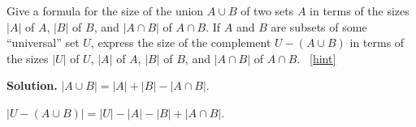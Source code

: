 \documentclass{book}
\begin{document}
\setcounter{project}{217}
\addtocounter{project}{-1}
\begin{activity}[]\label{twosetintersection}
\hypertarget{p-1220}{}%
Give a formula for the size of the union \(A\cup B\) of two sets \(A\) in terms of the sizes \(|A|\) of \(A\), \(|B|\) of \(B\), and \(|A\cap B|\) of \(A\cap B\). If \(A\) and \(B\) are subsets of some ``universal'' set \(U\), express the size of the complement \(U-(A\cup B)\) in terms of the sizes \(|U|\) of \(U\), \(|A|\) of \(A\), \(|B|\) of \(B\), and \(|A\cap B|\) of \(A\cap B\).%
~\hfill{\tiny\hyperlink{a-217}{[hint]}\hypertarget{q-217}{}}\par\smallskip%
\noindent\textbf{Solution.}\hypertarget{solution-140}{}\quad%
\hypertarget{p-1222}{}%
\(|A\cup B|=|A| + |B| - |A\cap B|\).%
\par
\hypertarget{p-1223}{}%
\(|U-(A\cup B)| = |U|-|A|-|B| + |A
\cap B|\).%
\end{activity}
\end{document}
